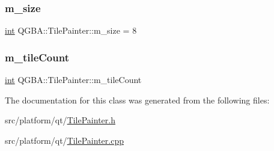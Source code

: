 \subsubsection{\texorpdfstring{m\+\_\+size}{m\_size}}
{\footnotesize\ttfamily \mbox{\hyperlink{ioapi_8h_a787fa3cf048117ba7123753c1e74fcd6}{int}} Q\+G\+B\+A\+::\+Tile\+Painter\+::m\+\_\+size = 8\hspace{0.3cm}{\ttfamily [private]}}

\mbox{\label{class_q_g_b_a_1_1_tile_painter_a59a17a4d1cf1cc1ba3e4db33d2dc19e9}} 
\subsubsection{\texorpdfstring{m\+\_\+tile\+Count}{m\_tileCount}}
{\footnotesize\ttfamily \mbox{\hyperlink{ioapi_8h_a787fa3cf048117ba7123753c1e74fcd6}{int}} Q\+G\+B\+A\+::\+Tile\+Painter\+::m\+\_\+tile\+Count\hspace{0.3cm}{\ttfamily [private]}}



The documentation for this class was generated from the following files\+:\begin{DoxyCompactItemize}
\item 
src/platform/qt/\mbox{\hyperlink{_tile_painter_8h}{Tile\+Painter.\+h}}\item 
src/platform/qt/\mbox{\hyperlink{_tile_painter_8cpp}{Tile\+Painter.\+cpp}}\end{DoxyCompactItemize}
